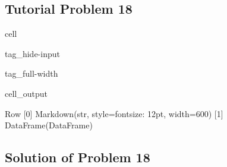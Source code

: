 \documentclass[letterpaper,10pt,english]{jupyterBook}
\begin{document}
\subsection{Tutorial Problem 18}
\label{\detokenize{content/tutorials/T7/tutorial_07:tutorial-problem-18}}
\begin{sphinxuseclass}{cell}
\begin{sphinxuseclass}{tag_hide-input}
\begin{sphinxuseclass}{tag_full-width}\begin{sphinxVerbatimOutput}

\begin{sphinxuseclass}{cell_output}
\begin{sphinxVerbatim}[commandchars=\\\{\}]
Row
    [0] Markdown(str, style=\PYGZob{}\PYGZsq{}font\PYGZhy{}size\PYGZsq{}: \PYGZsq{}12pt\PYGZsq{}\PYGZcb{}, width=600)
    [1] DataFrame(DataFrame)
\end{sphinxVerbatim}

\end{sphinxuseclass}\end{sphinxVerbatimOutput}

\end{sphinxuseclass}
\end{sphinxuseclass}
\end{sphinxuseclass}

\subsection{Solution of Problem 18}
\label{\detokenize{content/tutorials/T7/tutorial_07:solution-of-problem-18}}
\sphinxAtStartPar
{}
\end{document}
